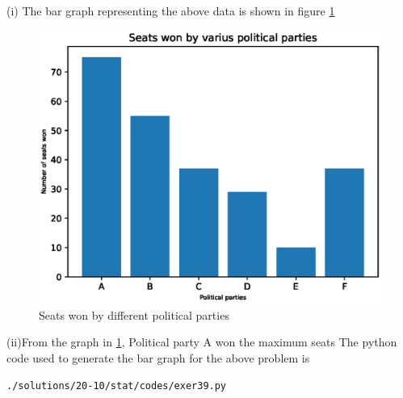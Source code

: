 (i) The bar graph representing the above data is shown in figure \ref{fig:bar39_py}\\
\begin{figure}[!ht]
\centering
\includegraphics[width=\columnwidth]{./solutions/20-10/stat/codes/pyfigs/exer39.eps}
\caption{Seats won by different political parties}
\label{fig:bar39_py}
\end{figure}
(ii)From the graph in \ref{fig:bar39_py}, Political party A won the maximum seats
The python code used to generate the bar graph for the above problem is
\begin{lstlisting}
./solutions/20-10/stat/codes/exer39.py
\end{lstlisting}
